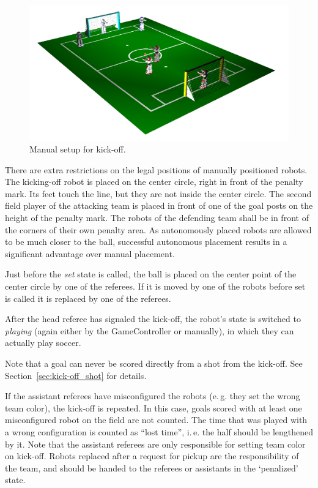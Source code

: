 \documentclass[12pt]{article}
\newcommand{\ie}{\mbox{i.\,e.}\xspace}
\newcommand{\eg}{\mbox{e.\,g.}\xspace}
\begin{document}
\begin{figure}[t]
\centerline{\includegraphics[width=\columnwidth]{figs/manual_placement}}
\caption{Manual setup for kick-off.}
\label{fig:ko}
\end{figure}

There are extra restrictions on the legal positions of manually positioned robots. The kicking-off robot is placed on the center circle, right in front of the penalty mark. Its feet touch the line, but they are not inside the center circle. The second field player of the attacking team is placed in front of one of the goal posts on the height of the penalty mark. The robots of the defending team shall be in front of the corners of their own penalty area. As autonomously placed robots are allowed to be much closer to the ball, successful autonomous placement results in a significant advantage over manual placement.

Just before the \emph{set} state is called, the ball is placed on the center point of the center circle by one of the referees. If it is moved by one of the robots before set is called it is replaced by one of the referees.

After the head referee has signaled the kick-off, the robot's state is switched to \emph{playing} (again either by the GameController or manually), in which they can actually play soccer.

Note that a goal can never be scored directly from a shot from the kick-off. See Section~\ref{sec:kick-off_shot} for details.

If the assistant referees have misconfigured the robots (\eg they set the wrong team color), the kick-off is repeated. In this case, goals scored with at least one misconfigured robot on the field are not counted. The time that was played with a wrong configuration is counted as ``lost time'', \ie the half should be lengthened by it. Note that the assistant referees are only responsible for setting team color on kick-off. Robots replaced after a request for pickup are the responsibility of the team, and should be handed to the referees or assistants in the `penalized' state.
\end{document}
